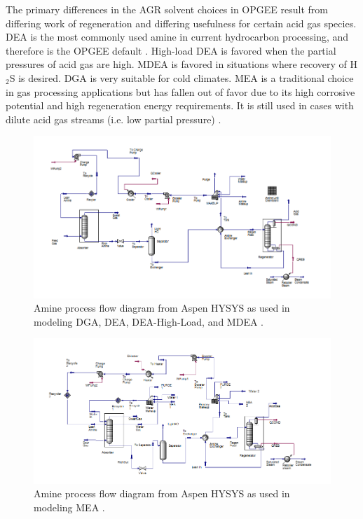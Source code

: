 \documentclass[11pt]{report}
\begin{document}
The primary differences in the AGR solvent choices in OPGEE result from differing work of regeneration and differing usefulness for certain acid gas species. DEA is the most commonly used amine in current hydrocarbon processing, and therefore is the OPGEE default \cite{Manning1991}. High-load DEA is favored when the partial pressures of acid gas are high.  MDEA is favored in situations where recovery of H$_2$S is desired.  DGA is very suitable for cold climates.  MEA is a traditional choice in gas processing applications but has fallen out of favor due to its high corrosive potential and high regeneration energy requirements. It is still used in cases with dilute acid gas streams (i.e. low partial pressure) \cite{Manning1991}.

\begin{figure}
\includegraphics[width=1.2\columnwidth]{images/Aspen_AGR_General.png}
\caption{Amine process flow diagram from Aspen HYSYS as used in modeling DGA, DEA, DEA-High-Load, and MDEA \cite{Aspentech2016}.}
\label{fig:Aspen_AGR_General}
\end{figure}

\begin{figure}
\includegraphics[width=1.2\columnwidth]{images/Aspen_AGR_MEA.png}
\caption{Amine process flow diagram from Aspen HYSYS as used in modeling MEA \cite{Aspentech2016}.}
\label{fig:Aspen_AGR_MEA}
\end{figure}
\end{document}
